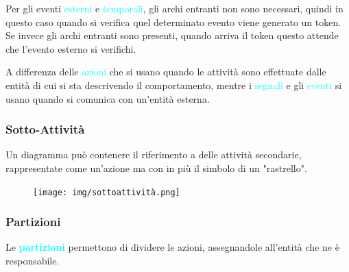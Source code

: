 \begin{itemize}
\begin{figure}[H]
        \end{figure}
\end{itemize}

Per gli eventi \textcolor{cyan}{esterni} e \textcolor{cyan}{temporali}, gli archi entranti non sono
necessari, quindi in questo caso quando si verifica quel determinato evento viene generato un token.
Se invece gli archi entranti sono presenti, quando arriva il token questo attende che l'evento esterno si verifichi.

A differenza delle \textcolor{cyan}{azioni} che si usano quando le attività sono effettuate
dalle entità di cui si sta descrivendo il comportamento, mentre i \textcolor{cyan}{segnali} e gli
\textcolor{cyan}{eventi} si usano quando si comunica con un'entità esterna.

\subsubsection{Sotto-Attività}

Un diagramma può contenere il riferimento a delle attività secondarie, rappresentate
come un'azione ma con in più il simbolo di un "rastrello".

\begin{figure}[h]
    \centering
    \texttt{[image: img/sottoattività.png]}
\end{figure}

\subsubsection{Partizioni}

Le \textbf{\textcolor{cyan}{partizioni}} permettono di dividere le azioni, assegnandole
all'entità che ne è responsabile.